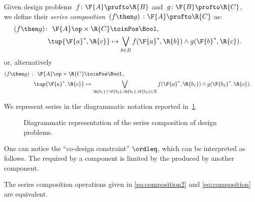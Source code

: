 \begin{definition}
  \label{def:dp-series}
  Given design problems~$f \colon  \F{A} \profto \R{B}$ and~$g \colon \F{B} \profto \R{C}$, we define their \emph{series composition}~$(f\then g)\ \colon  \F{A} \profto \R{C}$
  as:
  \begin{equation}
    \label{eq:composition2}
    \begin{aligned}
      (f \then g)  \colon \ \F{A}\op \times \R{C} & \toinPos  \Bool, \\
      \tup{\F{a}^*, \R{c}} &\mapsto \bigvee_{b\in B} f(\F{a}^*,\R{b}) \wedge g(\F{b}^*,\R{c}).
    \end{aligned}
  \end{equation}
  or, alternatively
  \begin{equation}
    \begin{aligned}
      \label{eq:composition}
      (f \then g)\  \colon \ \F{A}\op \times \R{C} & \toinPos  \Bool,  \\
      \tup{\F{a}^*, \R{c}} &\mapsto \bigvee_{\R{b_1}\leq\F{b_2}, \R{b_1},\F{b_2}\in B} f(\F{a}^*,\R{b_1}) \wedge g(\F{b_2}^*,\R{c}).
    \end{aligned}
  \end{equation}
\end{definition}
\noindent We represent series in the diagrammatic notation reported in~\cref{fig:compositiondiagram}.
\begin{figure}[h!]
  \begin{center}
  \end{center}
  \caption{Diagrammatic representation of the series composition of design problems. \label{fig:compositiondiagram}}
\end{figure}

One can notice the ``co-design constraint'' $\ordleq$, which can be interpreted as follows. The  required by a component is limited by the  produced by another component.

\begin{lemma}
  \label{lemma:composition_equivalency}
  The series composition operations given in \cref{eq:composition2} and \cref{eq:composition} are equivalent.
\end{lemma}

